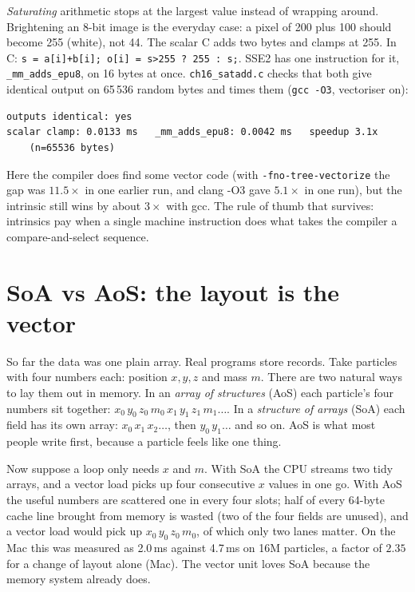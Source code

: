 \begin{example}
\emph{Saturating} arithmetic stops at the largest value instead of
wrapping around. Brightening an 8-bit image is the everyday case: a pixel of
200 plus 100 should become 255 (white), not 44. The scalar C adds two bytes and clamps at 255. In C:
\texttt{s = a[i]+b[i]; o[i] = s>255 ? 255 : s;}. SSE2 has one
instruction for it, \texttt{\_mm\_adds\_epu8}, on 16 bytes at once.
\texttt{ch16\_satadd.c} checks that both give identical output on
65\,536 random bytes and times them (\texttt{gcc -O3}, vectoriser on):

{\scriptsize
\begin{verbatim}
outputs identical: yes
scalar clamp: 0.0133 ms   _mm_adds_epu8: 0.0042 ms   speedup 3.1x
    (n=65536 bytes)
\end{verbatim}
}
Here the compiler does find some vector code (with
\texttt{-fno-tree-vectorize} the gap was $11.5\times$ in one earlier
run, and clang -O3 gave $5.1\times$ in one run), but the intrinsic
still wins by about $3\times$ with gcc. The rule of thumb that
survives: intrinsics pay when a single machine instruction does what
takes the compiler a compare-and-select sequence.
\end{example}

\section{SoA vs AoS: the layout is the vector}

So far the data was one plain array. Real programs store records. Take
particles with four numbers each: position $x,y,z$ and mass $m$. There
are two natural ways to lay them out in memory. In an \emph{array of
structures} (AoS) each particle's four numbers sit together:
$x_0\,y_0\,z_0\,m_0\,x_1\,y_1\,z_1\,m_1\dots$. In a \emph{structure of
arrays} (SoA) each field has its own array: $x_0\,x_1\,x_2\dots$, then
$y_0\,y_1\dots$ and so on. AoS is what most people write first, because a
particle feels like one thing.


Now suppose a loop only needs $x$ and $m$. With SoA the CPU streams two
tidy arrays, and a vector load picks up four consecutive $x$ values in one
go. With AoS the useful numbers are scattered one in every four slots; half
of every 64-byte cache line brought from memory is wasted (two of the four
fields are unused), and a vector load would pick up $x_0\,y_0\,z_0\,m_0$, of which
only two lanes matter. On the Mac this was measured as 2.0\,ms against
4.7\,ms on 16M particles, a factor of $2.35$ for a change of layout alone
(Mac). The vector unit loves SoA because the memory system already does.


